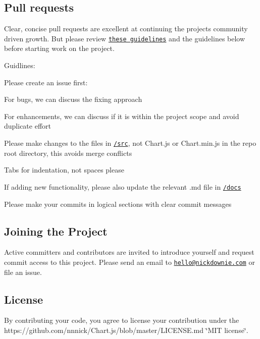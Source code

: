\subsection*{Pull requests }

Clear, concise pull requests are excellent at continuing the project\textquotesingle{}s community driven growth. But please review \href{https://github.com/blog/1943-how-to-write-the-perfect-pull-request}{\tt these guidelines} and the guidelines below before starting work on the project.

Guidlines\+:


\begin{DoxyItemize}
\item Please create an issue first\+:
\begin{DoxyItemize}
\item For bugs, we can discuss the fixing approach
\item For enhancements, we can discuss if it is within the project scope and avoid duplicate effort
\end{DoxyItemize}
\item Please make changes to the files in \href{https://github.com/nnnick/Chart.js/tree/master/src}{\tt {\ttfamily /src}}, not {\ttfamily Chart.\+js} or {\ttfamily Chart.\+min.\+js} in the repo root directory, this avoids merge conflicts
\item Tabs for indentation, not spaces please
\item If adding new functionality, please also update the relevant {\ttfamily .md} file in \href{https://github.com/nnnick/Chart.js/tree/master/docs}{\tt {\ttfamily /docs}}
\item Please make your commits in logical sections with clear commit messages
\end{DoxyItemize}

\subsection*{Joining the Project }


\begin{DoxyItemize}
\item Active committers and contributors are invited to introduce yourself and request commit access to this project. Please send an email to \href{mailto:hello@nickdownie.com}{\tt hello@nickdownie.\+com} or file an issue.
\end{DoxyItemize}

\subsection*{License }

By contributing your code, you agree to license your contribution under the https\+://github.com/nnnick/\+Chart.\+js/blob/master/\+L\+I\+C\+E\+N\+SE.md \char`\"{}\+M\+I\+T license\char`\"{}. 